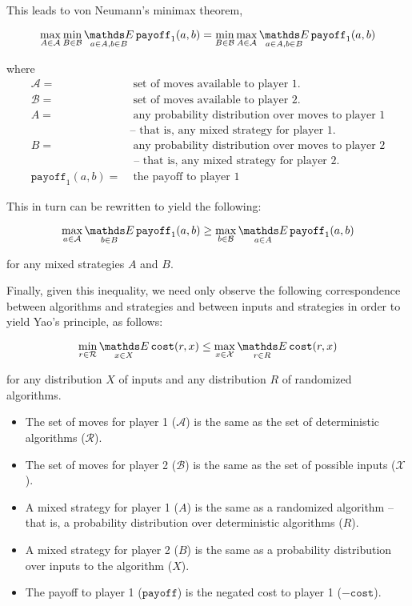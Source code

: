 
This leads to von Neumann's minimax theorem,

$$\max_{A \in \mathcal{A}} \min_{B \in \mathcal{B}} \Expected_{a \in A, b \in B} \texttt{payoff}_1(a, b) = \min_{B \in \mathcal{B}} \max_{A \in \mathcal{A}} \Expected_{a \in A, b \in B} \texttt{payoff}_1(a, b)$$


where \begin{align*}
\mathcal{A} =&\; \text{set of moves available to player 1.}
\\
\mathcal{B} =&\; \text{set of moves available to player 2.}
\\
A =&\; \text{any probability distribution over moves to player 1}
    \\&\text{-- that is, any mixed strategy for player 1.}
\\
B =&\; \text{any probability distribution over moves to player 2}
    \\&\text{ -- that is, any mixed strategy for player 2.}
\\
\texttt{payoff}_1(a, b) =&\; \text{the payoff to player 1}
\end{align*}

This in turn can be rewritten to yield the following:

$$\max_{a \in \mathcal{A}} \Expected_{b \in B} \texttt{payoff}_1(a, b) \geq \max_{b \in \mathcal{B}} \Expected_{a \in A} \texttt{payoff}_1(a, b)$$

for any mixed strategies $A$ and $B$.

Finally, given this inequality, we need only observe the following correspondence between algorithms and strategies and between inputs and strategies in order to yield Yao's principle, as follows:

$$\min_{r \in \mathcal{R}} \Expected_{x \in X} \texttt{cost}(r, x) \leq \max_{x \in \mathcal{X}} \Expected_{r \in R} \texttt{cost}(r, x)$$

for any distribution $X$ of inputs and any distribution $R$ of randomized algorithms.

\begin{itemize}

\item{The set of moves for player 1 ($\mathcal{A}$) is the same as the set of deterministic algorithms ($\mathcal{R}$).}
\item{The set of moves for player 2 ($\mathcal{B}$) is the same as the set of possible inputs ($\mathcal{X}$).}
\item{A mixed strategy for player 1 ($A$) is the same as a randomized algorithm -- that is, a probability distribution over deterministic algorithms ($R$).}
\item{A mixed strategy for player 2 ($B$) is the same as a probability distribution over inputs to the algorithm ($X$).}
\item{The payoff to player 1 ($\texttt{payoff}$) is the negated cost to player 1 ($-\texttt{cost}$).}

\end{itemize}


